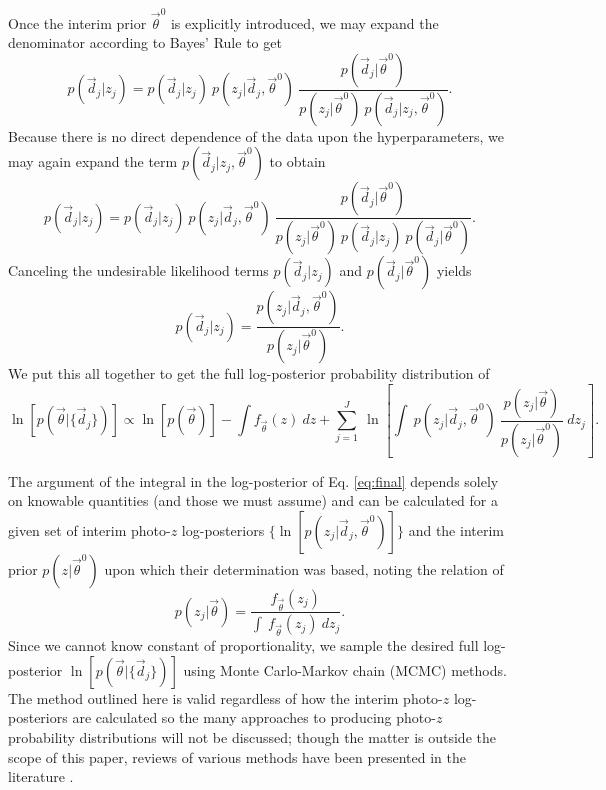 \documentclass[preprint]{aastex}
\begin{document}
Once the interim prior $\vec{\theta}^{0}$ is explicitly introduced, we may 
expand the denominator according to Bayes' Rule to get 
\begin{equation}\label{eq:expand} p(\vec{d}_{j}|z_{j}) = p(\vec{d}_{j}|z_{j})\ 
p(z_{j}|\vec{d}_{j},\vec{\theta}^{0})\ 
\frac{p(\vec{d}_{j}|\vec{\theta}^{0})}{p(z_{j}|\vec{\theta}^{0})\ 
p(\vec{d}_{j}|z_{j},\vec{\theta}^{0})}.\end{equation}  Because there is no 
direct dependence of the data upon the hyperparameters, we may again expand the 
term $p(\vec{d}_{j}|z_{j},\vec{\theta}^{0})$ to obtain 
\begin{equation}\label{eq:indterm} p(\vec{d}_{j}|z_{j}) = p(\vec{d}_{j}|z_{j})\ 
p(z_{j}|\vec{d}_{j},\vec{\theta}^{0})\ 
\frac{p(\vec{d}_{j}|\vec{\theta}^{0})}{p(z_{j}|\vec{\theta}^{0})\ 
p(\vec{d}_{j}|z_{j})\ p(\vec{d}_{j}|\vec{\theta}^{0})}.\end{equation}  
Canceling the undesirable likelihood terms $p(\vec{d}_{j}|z_{j})$ and 
$p(\vec{d}_{j}|\vec{\theta}^{0})$ yields \begin{equation}\label{eq:cancel} 
p(\vec{d}_{j}|z_{j}) = 
\frac{p(z_{j}|\vec{d}_{j},\vec{\theta}^{0})}{p(z_{j}|\vec{\theta}^{0})}.\end{equation}  We put this all together to get the full log-posterior probability 
distribution of \begin{equation}\label{eq:final} 
\ln[p(\vec{\theta}|\{\vec{d}_{j}\})] \propto \ln[p(\vec{\theta})]-\int 
f_{\vec{\theta}}(z)\ dz + \sum_{j=1}^{J}\ \ln\left[\int\ 
p(z_{j}|\vec{d}_{j},\vec{\theta}^{0})\ 
\frac{p(z_{j}|\vec{\theta})}{p(z_{j}|\vec{\theta}^{0})}\ 
dz_{j}\right].\end{equation}

The argument of the integral in the log-posterior of Eq. \ref{eq:final} depends 
solely on knowable quantities (and those we must assume) and can be calculated 
for a given set of interim photo-$z$ log-posteriors 
$\{\ln[p(z_{j}|\vec{d}_{j},\vec{\theta}^{0})]\}$ and the interim prior 
$p(z|\vec{\theta}^{0})$ upon which their determination was based, noting the 
relation of \begin{equation}\label{eq:params}p(z_{j}|\vec{\theta}) = 
\frac{f_{\vec{\theta}}(z_{j})}{\int\ f_{\vec{\theta}}(z_{j})\ 
dz_{j}}.\end{equation}  Since we cannot know constant of proportionality, we 
sample the desired full log-posterior $\ln[p(\vec{\theta}|\{\vec{d}_{j}\})]$ 
using Monte Carlo-Markov chain (MCMC) methods.  The method outlined here is 
valid regardless of how the interim photo-$z$ log-posteriors are calculated so 
the many approaches to producing photo-$z$ probability distributions will not 
be discussed; though the matter is outside the scope of this paper, reviews of 
various methods have been presented in the literature \citep{Sheldon2012, 
Ball2008, CarrascoKind2013, CarrascoKind2014a}.
\end{document}
